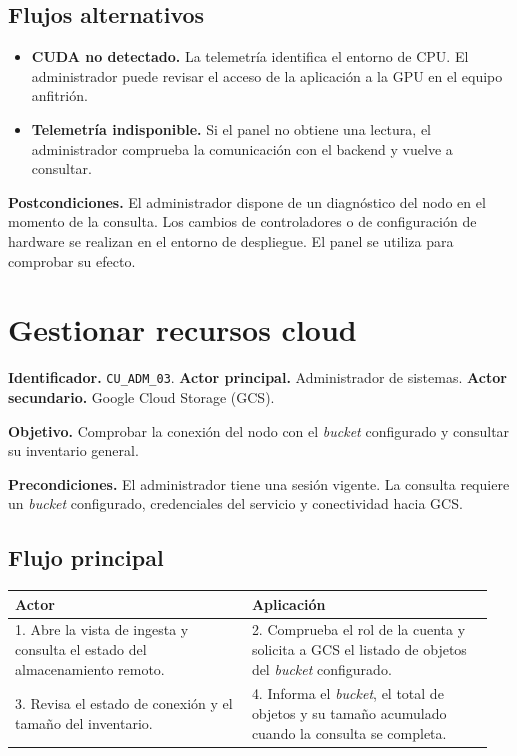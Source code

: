 \subsection*{Flujos alternativos}

\begin{itemize}
    \item \textbf{CUDA no detectado.} La telemetría identifica el
    entorno de CPU. El administrador puede revisar el acceso de la
    aplicación a la GPU en el equipo anfitrión.
    \item \textbf{Telemetría indisponible.} Si el panel no obtiene una
    lectura, el administrador comprueba la comunicación con el
    backend y vuelve a consultar.
\end{itemize}

\noindent\textbf{Postcondiciones.} El administrador dispone de un
diagnóstico del nodo en el momento de la consulta. Los cambios de
controladores o de configuración de hardware se realizan en el
entorno de despliegue. El panel se utiliza para comprobar su efecto.

\section{Gestionar recursos cloud}
\label{cu:adm-03}

\noindent\textbf{Identificador.} \texttt{CU\_ADM\_03}.
\textbf{Actor principal.} Administrador de sistemas.
\textbf{Actor secundario.} Google Cloud Storage (GCS).

\noindent\textbf{Objetivo.} Comprobar la conexión del nodo con el
\emph{bucket} configurado y consultar su inventario general.

\noindent\textbf{Precondiciones.} El administrador tiene una sesión
vigente. La consulta requiere un \emph{bucket} configurado, credenciales
del servicio y conectividad hacia GCS.

\subsection*{Flujo principal}

\noindent
\begin{tabular}{@{}p{0.47\linewidth}p{0.48\linewidth}@{}}
    \hline
    \textbf{Actor} & \textbf{Aplicación} \\
    \hline
    1. Abre la vista de ingesta y consulta el estado del almacenamiento remoto. &
    2. Comprueba el rol de la cuenta y solicita a GCS el listado de objetos del \emph{bucket} configurado. \\
    3. Revisa el estado de conexión y el tamaño del inventario. &
    4. Informa el \emph{bucket}, el total de objetos y su tamaño acumulado cuando la consulta se completa. \\
    \hline
\end{tabular}

